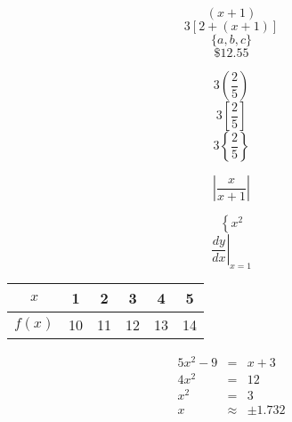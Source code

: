 \documentclass[11pt]{article}
\begin{document}
$$(x+1)$$
$$3[2+(x+1)]$$
$$\{a,b,c\}$$
$$\$12.55$$

$$3\left(\frac{2}{5}\right)$$
$$3\left[\frac{2}{5}\right]$$
$$3\left\{\frac{2}{5}\right\}$$

$$\left|\frac{x}{x+1}\right|$$

$$\left\{x^2\right.$$
$$\left. \frac{dy}{dx} \right|_{x=1}$$

\begin{tabular}{|c|c|c|c|c|c|}
\hline
$x$ & 1 & 2 & 3 & 4 & 5 \\ \hline
$f(x)$ & 10 & 11 & 12 & 13 & 14\\ \hline
\end{tabular}

\begin{eqnarray*}
5x^2-9&=&x+3\\
4x^2&=&12\\
x^2&=&3\\
x&\approx&\pm1.732
\end{eqnarray*}
\end{document}

